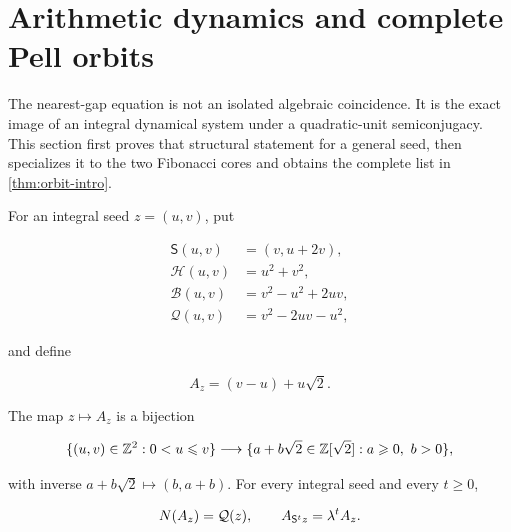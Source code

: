 %
%
\section{Arithmetic dynamics and complete Pell orbits}
\label{sec:zero-defect}

The nearest-gap equation is not an isolated algebraic coincidence. It is the
exact image of an integral dynamical system under a quadratic-unit
semiconjugacy. This section first proves that structural statement for a
general seed, then specializes it to the two Fibonacci cores and obtains the
complete list in \cref{thm:orbit-intro}.

For an integral seed $z=(u,v)$, put

\begin{equation}
\begin{aligned}
 \mathsf S(u,v)&=(v,u+2v),\\
 \mathcal H(u,v)&=u^2+v^2,\\
 \mathcal B(u,v)&=v^2-u^2+2uv,\\
 \mathcal Q(u,v)&=v^2-2uv-u^2,
\end{aligned}
\label{eq:orbit-forms}
\end{equation}

and define

\begin{equation}
 A_z=(v-u)+u\sqrt2.
 \label{eq:seed-unit-map}
\end{equation}

\begin{proposition}
\label{prop:seed-semiconjugacy}
The map $z\mapsto A_z$ is a bijection

\begin{equation}
 \{(u,v)\in\mathbb{Z}^2:0<u\leqslant v\}
 \longrightarrow
 \{a+b\sqrt2\in\mathbb{Z}[\sqrt2]:a\geqslant0,\ b>0\},
 \label{eq:cone-bijection}
\end{equation}

with inverse $a+b\sqrt2\mapsto(b,a+b)$. For every integral seed and every
$t\geqslant0$,

\begin{equation}
 N\!\left(A_z\right)=\mathcal Q(z),
 \qquad
 A_{\mathsf S^tz}=\lambda^tA_z.
 \label{eq:semiconjugacy}
\end{equation}
\end{proposition}

